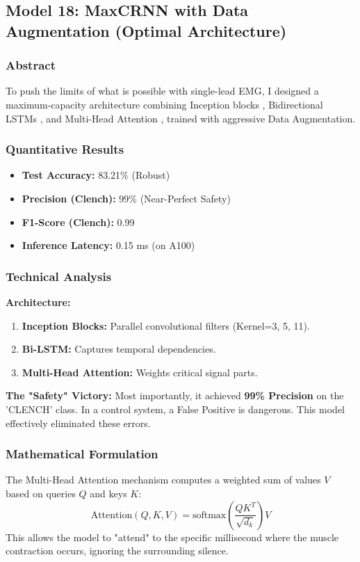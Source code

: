 \documentclass{article}
\begin{document}
\clearpage
\subsection{Model 18: MaxCRNN with Data Augmentation (Optimal Architecture)}
\subsubsection{Abstract}
To push the limits of what is possible with single-lead EMG, I designed a maximum-capacity architecture combining Inception blocks \cite{inception}, Bidirectional LSTMs \cite{lstm}, and Multi-Head Attention \cite{attention}, trained with aggressive Data Augmentation.

\subsubsection{Quantitative Results}
\begin{itemize}
    \item \textbf{Test Accuracy:} 83.21\% (Robust)
    \item \textbf{Precision (Clench):} 99\% (Near-Perfect Safety)
    \item \textbf{F1-Score (Clench):} 0.99
    \item \textbf{Inference Latency:} 0.15 ms (on A100)
\end{itemize}

\subsubsection{Technical Analysis}
\textbf{Architecture:}
\begin{enumerate}
    \item \textbf{Inception Blocks:} Parallel convolutional filters (Kernel=3, 5, 11).
    \item \textbf{Bi-LSTM:} Captures temporal dependencies.
    \item \textbf{Multi-Head Attention:} Weights critical signal parts.
\end{enumerate}
\textbf{The "Safety" Victory:} Most importantly, it achieved \textbf{99\% Precision} on the 'CLENCH' class. In a control system, a False Positive is dangerous. This model effectively eliminated these errors.

\subsubsection{Mathematical Formulation}
The Multi-Head Attention mechanism computes a weighted sum of values $V$ based on queries $Q$ and keys $K$:
\begin{equation}
    \text{Attention}(Q, K, V) = \text{softmax}\left(\frac{QK^T}{\sqrt{d_k}}\right)V
\end{equation}
This allows the model to "attend" to the specific millisecond where the muscle contraction occurs, ignoring the surrounding silence.
\end{document}
